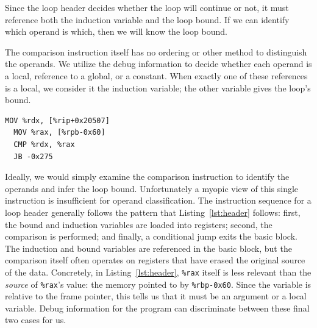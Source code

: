
Since the loop header decides whether the loop will continue or not, it
must reference both the induction variable and the loop bound.  If we
can identify which operand is which, then we will know the loop bound.

The comparison instruction itself has no ordering or other method to
distinguish the operands.  We utilize the debug information to decide
whether each operand is a local, reference to a global, or a constant.
When exactly one of these references is a local, we consider it the
induction variable; the other variable gives the loop's bound.

\begin{lstlisting}[label=lst:header,caption=Instructions within a
sample loop header.  Both the induction variable and the loop bound
appear as arguments to the \texttt{CMP} instruction.  The preceding
instructions are still necessary for distinguishing between the two
variables.]
  MOV %rdx, [%rip+0x20507]
  MOV %rax, [%rpb-0x60]
  CMP %rdx, %rax
  JB -0x275
\end{lstlisting}

Ideally, we would simply examine the comparison instruction to identify
the operands and infer the loop bound. Unfortunately a myopic view of
this single instruction is insufficient for operand classification.
The instruction sequence for a loop header generally follows the
pattern that
Listing~\ref{lst:header} follows: first, the bound and induction
variables are loaded into registers; second, the comparison is
performed; and finally, a conditional jump exits the basic block.  The
induction and bound variables are referenced in the basic block, but
the comparison itself often operates on registers that have erased the
original source of the data.  Concretely, in Listing~\ref{lst:header},
\texttt{\%rax} itself is less relevant than the \emph{source} of
\texttt{\%rax}'s
value: the memory pointed to by \texttt{\%rbp-0x60}.  Since the variable
is relative to the frame pointer, this tells us that it must be an
argument or a local variable.  Debug information for the program can
discriminate between these final two cases for us.

